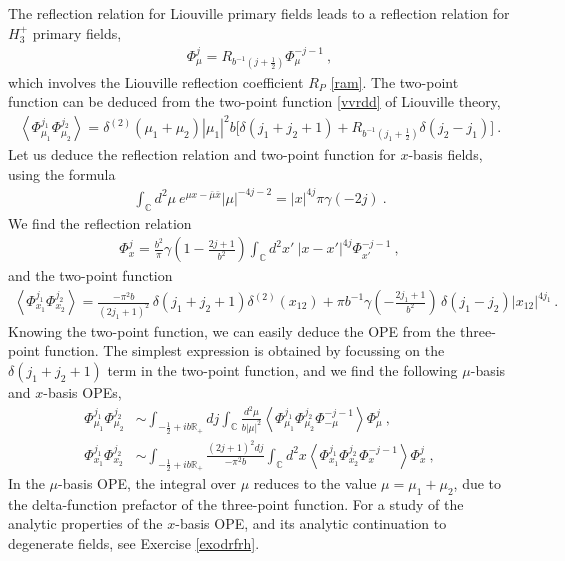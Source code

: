 \documentclass[12pt, a4paper, notitlepage, twoside]{report}
\numberwithin{equation}{section}
\theoremstyle{break}
\begin{document}
The reflection relation for Liouville primary fields leads to a reflection relation for $H_3^+$ primary fields,
\begin{align}
 \Phi^j_{\mu} = R_{b^{-1}(j+\frac12)} \Phi^{-j-1}_{\mu} \ ,
\end{align}
which involves the Liouville reflection coefficient $R_P$ \eqref{ram}. The two-point function can be deduced from the two-point function \eqref{vvrdd} of Liouville theory, 
\begin{align}
 \left\langle \Phi^{j_1}_{\mu_1} \Phi^{j_2}_{\mu_2}\right\rangle = \delta^{(2)}(\mu_1+\mu_2) |\mu_1|^2 b\Big[\delta(j_1+j_2+1) + R_{b^{-1}(j_1+\frac12)} \delta(j_2-j_1)\Big]\ .
\end{align}
Let us deduce the reflection relation and two-point function for $x$-basis fields, using the formula  
\begin{align}
 \int_{{\mathbb{C}}}d^2\mu\ e^{\mu x-\bar{\mu}\bar{x}} |\mu|^{-4j-2} = |x|^{4j}\pi \gamma(-2j) \ .
\label{icmx}
\end{align}
We find the reflection relation 
\begin{align}
 \Phi^j_{x} = \frac{b^2}{\pi}\gamma\left(1-\tfrac{2j+1}{b^2}\right)\int_{{\mathbb{C}}}d^2x'\ |x-x'|^{4j}\Phi^{-j-1}_{x'}\ ,
\end{align}
and the two-point function 
\begin{align}
 \left\langle \Phi^{j_1}_{x_1} \Phi^{j_2}_{x_2} \right\rangle = \frac{-\pi^2 b}{(2j_1+1)^2}\, \delta(j_1+j_2+1)\delta^{(2)}(x_{12}) 
+ \pi b^{-1} \gamma\left(-\tfrac{2j_1+1}{b^2}\right)\, \delta(j_1-j_2)|x_{12}|^{4j_1}\, .
\label{pjpj}
\end{align}
Knowing the two-point function, we can easily deduce the OPE from the three-point function. 
The simplest expression is obtained by focussing on the $\delta(j_1+j_2+1)$ term in the two-point function, and we find the following $\mu$-basis and $x$-basis OPEs,
\begin{align}
\Phi^{j_1}_{\mu_1}\Phi^{j_2}_{\mu_2} &\sim  \int_{-\frac12 + ib\mathbb{R}_+} dj\int_{{\mathbb{C}}}\frac{d^2\mu}{b|\mu|^2} \left\langle \Phi^{j_1}_{\mu_1}\Phi^{j_2}_{\mu_2} \Phi^{-j-1}_{-\mu} \right\rangle \Phi^j_{\mu}\ , 
\label{mope}
\\
\Phi^{j_1}_{x_1}\Phi^{j_2}_{x_2} &\sim \int_{-\frac12 + ib\mathbb{R}_+} \frac{(2j+1)^2 dj}{-\pi^2b}\int_{{\mathbb{C}}}d^2x \left\langle \Phi^{j_1}_{x_1}\Phi^{j_2}_{x_2} \Phi^{-j-1}_{x} \right\rangle \Phi^j_{x}\ ,
\label{xope}
\end{align}
In the $\mu$-basis OPE, the integral over $\mu$ reduces to the value $\mu=\mu_1+\mu_2$, due to the delta-function prefactor of the three-point function. 
For a study of the analytic properties of the $x$-basis OPE, and its analytic continuation to degenerate fields, see Exercise \ref{exodrfrh}.
\end{document}
